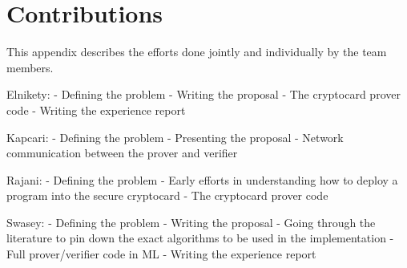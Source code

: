 \section{Contributions}

\begin{comment}
	\emph{EE:} Aniket’s Summary of Contributions (no hosing)
\end{comment}

This appendix describes the efforts done jointly and individually by the team
members.

Elnikety:
- Defining the problem
- Writing the proposal
- The cryptocard prover code
- Writing the experience report



Kapcari:
- Defining the problem
- Presenting the proposal
- Network communication between the prover and verifier



Rajani:
- Defining the problem
- Early efforts in understanding how to deploy a program into the secure
cryptocard
- The cryptocard prover code 



Swasey:
- Defining the problem
- Writing the proposal
- Going through the literature to pin down the exact algorithms to be used in
the implementation
- Full prover/verifier code in ML
- Writing the experience report